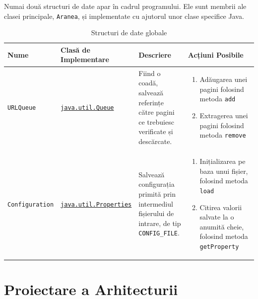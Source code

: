 \documentclass[12pt]{article}
\begin{document}
Numai două structuri de date apar în cadrul programului. Ele sunt membrii ale clasei principale, \texttt{Aranea}, și implementate cu ajutorul unor clase specifice Java.

\hypertarget{data_structures_link}{
    \begin{table}[H]
        \centering
        \begin{tabular}{ |p{0.2\linewidth} | p{0.30\linewidth} | p{0.2\linewidth} | p{0.3\linewidth} | } 
            \hline
            Nume & Clasă de Implementare & Descriere & Acțiuni Posibile \\
            \hline
            \texttt{URLQueue} & \href{https://docs.oracle.com/javase/8/docs/api/java/util/Queue.html}{\texttt{java.util.Queue}} & Fiind o coadă, salvează referințe către pagini ce trebuiesc verificate și descărcate. & 
                \begin{enumerate}
                    \item Adăugarea unei pagini folosind metoda \texttt{add}
                    \item Extragerea unei pagini folosind metoda \texttt{remove}
                \end{enumerate} \\
            \texttt{Configuration} & \href{https://docs.oracle.com/javase/tutorial/essential/environment/properties.html}{\texttt{java.util.Properties}} & Salvează configurația primită prin intermediul fișierului de intrare, de tip \texttt{CONFIG_FILE}. & 
                \begin{enumerate}
                    \item Inițializarea pe baza unui fișier, folosind metoda \texttt{load}
                    \item Citirea valorii salvate la o anumită cheie, folosind metoda  \texttt{getProperty}
                \end{enumerate} \\
            \hline
        \end{tabular}
        \caption{Structuri de date globale}
        \label{table:1}
    \end{table}
}

\newpage

\section{Proiectare a Arhitecturii}
\end{document}
